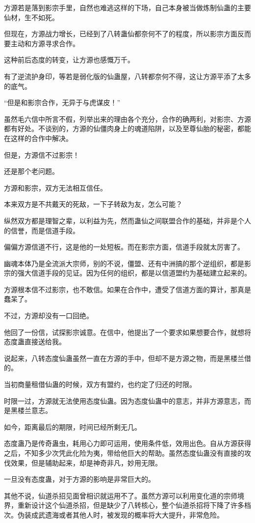 \begin{this_body}
方源若是落到影宗手里，自然也难逃这样的下场，自己本身被当做炼制仙蛊的主要仙材，生不如死。

但现在，方源战力增长，已经到了八转蛊仙都奈何不了的程度，所以影宗方面反而要主动和方源寻求合作。

这种前后态度的转变，让方源也感慨万千。

有了逆流护身印，等若是弱化版的仙蛊屋，八转都奈何不得，这让方源平添了太多的底气。

“但是和影宗合作，无异于与虎谋皮！”

虽然毛六信中所言不假，列举出来的理由各个充分，合作的确两利，对影宗、方源都有好处。不谈别的，方源的仙僵肉身上的魂道陷阱，以及至尊仙胎的秘密，都能在这样的合作中解决。

但是，方源信不过影宗！

还是那个老问题。

方源和影宗，双方无法相互信任。

本来双方是不共戴天的死敌，一下子转敌为友，怎么可能？

纵然双方都是理智之辈，以利益为先，然而蛊仙之间联盟合作的基础，并非是个人的信誉，而是信道手段。

偏偏方源信道不行，这是他的一处短板。而在影宗方面，信道手段就太厉害了。

幽魂本体乃是全流派大宗师，别的不说，僵盟、还有中洲搞的那个逆组织，都是影宗的强大信道手段的见证。因为任何的组织，都是以信道盟约为基础建立起来的。

方源根本信不过影宗，也不敢信。如果在合作中，遭受了信道方面的算计，那真是蠢呆了。

不过，方源却没有一口回绝。

他回了一份信，试探影宗诚意。在信中，他提出了一个要求如果想要合作，就想将态度蛊直接送给我。

说起来，八转态度仙蛊虽然一直在方源的手中，但却不是方源之物，而是黑楼兰借的。

当初商量租借仙蛊的时候，双方有盟约，也约定了归还的时限。

时限一过，方源就无法使用态度仙蛊。因为态度仙蛊中的意志，并非方源意志，而是黑楼兰意志。

如今，距离最后的期限，时间已经所剩无几。

态度蛊乃是传奇蛊虫，耗用心力即可运用，使用条件低，效用出色。自从方源获得之后，不知多少次凭此化险为夷，带给他巨大的帮助。虽然态度仙蛊没有直接的攻伐效果，但是辅助起来，却是神奇非凡，妙用无限。

一旦没有态度蛊，对于方源的影响是非常巨大的。

其他不说，仙道杀招见面曾相识就运用不了。虽然方源可以利用变化道的宗师境界，重新设计这个仙道杀招，但是缺少了八转核心，整个仙道杀招将下降了许多档次。伪装成武遗海或者其他人时，被发现的概率将大大提升，非常危险。


\end{this_body}
